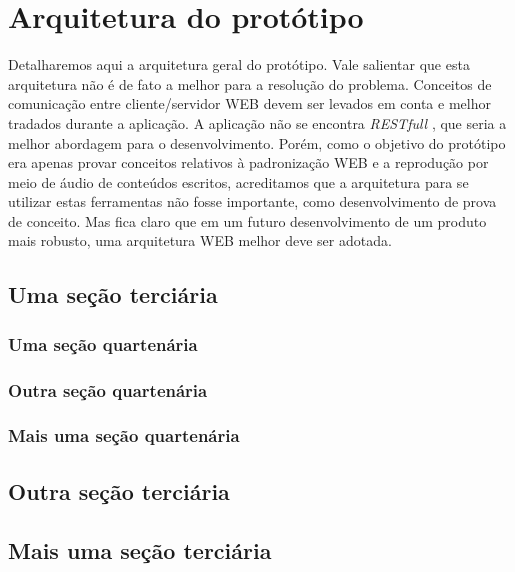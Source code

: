 \documentclass[
	12pt,				%
	oneside,			%
	a4paper,			%
	english,			%
	brazil				%
	]{abntex2ppgsi}
\begin{document}
\section{Arquitetura do protótipo} \label{sec:arquitetura_prototipo}

Detalharemos aqui a arquitetura geral do protótipo. Vale salientar que esta arquitetura não é de fato a melhor para a resolução do problema. Conceitos de comunicação entre cliente/servidor WEB devem ser levados em conta e melhor tradados durante a aplicação. A aplicação não se encontra \textit{RESTfull} \cite{rest}, que seria a melhor abordagem para o desenvolvimento. Porém, como o objetivo do protótipo era apenas provar conceitos relativos à padronização WEB e a reprodução por meio de áudio de conteúdos escritos, acreditamos que a arquitetura para se utilizar estas ferramentas não fosse importante, como desenvolvimento de prova de conceito. Mas fica claro que em um futuro desenvolvimento de um produto mais robusto, uma arquitetura WEB melhor deve ser adotada.



\subsection{Uma seção terciária}


\subsubsection{Uma seção quartenária}







\subsubsection{Outra seção quartenária}


\subsubsection{Mais uma seção quartenária}


\subsection{Outra seção terciária}


\subsection{Mais uma seção terciária}
\end{document}
